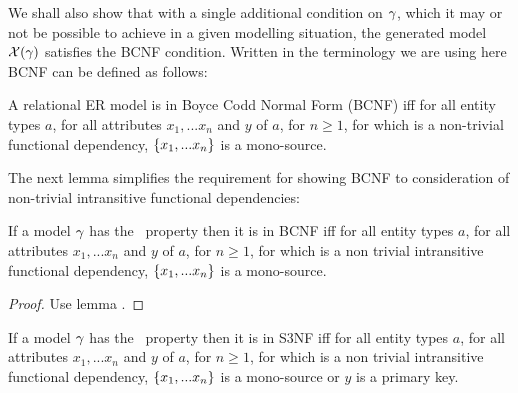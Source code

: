 We shall also show that with a single additional condition on $\gamma$, which it may or not be possible to achieve in a given modelling situation,
the generated model $\mathcal{X}(\gamma)$ satisfies the BCNF condition.
Written in the terminology we are using here BCNF can be defined as follows:
\begin{definition} %
A relational ER model is in Boyce Codd Normal Form (BCNF)  iff
for all entity types $a$, for all attributes $x_1,...x_n$ and $y$ of $a$, for $n \geq 1$, 
for which   is a non-trivial functional dependency, 
$\left\{x_1,...x_n\right\}$ is a mono-source.  
\end{definition}

\noindent The next lemma simplifies the requirement for showing BCNF to consideration of non-trivial
intransitive functional dependencies:

\begin{lemma}
If a model $\gamma$ has the \fdfactoring\ property then it is in BCNF iff
for all entity types $a$, for all attributes $x_1,...x_n$ and $y$ of $a$, for $n \geq 1$, 
for which  is a non trivial  intransitive functional dependency,
$\left\{x_1,...x_n\right\}$ is a mono-source. 
\end{lemma}
\begin{proof}Use lemma .
\end{proof}

\begin{lemma}
If a model $\gamma$ has the \fdfactoring\ property then it is in S3NF iff
for all entity types $a$, for all attributes $x_1,...x_n$ and $y$ of $a$, for $n \geq 1$, 
for which  is a non trivial intransitive functional dependency,
$\left\{x_1,...x_n\right\}$ is a mono-source or $y$ is a primary key. 
\end{lemma}
